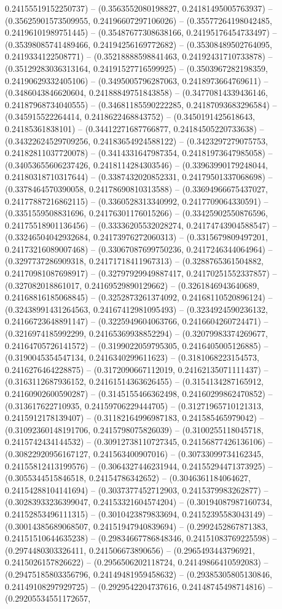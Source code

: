 0.24155519152250737) -- (0.3563552080198827, 0.24181495005763937) -- (0.35625901573509955, 0.24196607297106026) -- (0.35577264198042485, 0.24196101989751445) -- (0.35487677308638166, 0.24195176454733497) -- (0.35398085741489466, 0.24194256169772682) -- (0.35308489502764095, 0.2419334122508771) -- (0.35218888598841463, 0.24192431710733878) -- (0.35129283036313164, 0.24191527716599925) -- (0.3503967282198359, 0.24190629332405106) -- (0.3495005796287063, 0.2418973664769611) -- (0.3486043846620604, 0.24188849751843858) -- (0.34770814339436146, 0.24187968734040555) -- (0.34681185590222285, 0.24187093683296584) -- (0.345915522264414, 0.2418622468843752) -- (0.3450191425618643, 0.24185361838101) -- (0.34412271687766877, 0.24184505220733638) -- (0.34322624529709256, 0.24183654924588122) -- (0.3423297279075753, 0.24182811037720078) -- (0.3414331647987354, 0.24181973647985058) -- (0.34053655606237426, 0.2418114284303546) -- (0.33963990179248044, 0.24180318710317644) -- (0.3387432020852331, 0.24179501337068698) -- (0.3378464570390058, 0.24178690810313588) -- (0.33694966675437027, 0.24177887216862115) -- (0.3360528313340992, 0.2417709064330591) -- (0.3351559508831696, 0.24176301176015266) -- (0.33425902550876596, 0.24175518901136456) -- (0.33336205532028274, 0.24174743904588547) -- (0.33246504042932684, 0.24173976272060313) -- (0.3315679809497201, 0.24173216089007468) -- (0.33067087699750236, 0.2417246344064964) -- (0.3297737286909318, 0.24171718411967313) -- (0.3288765361504882, 0.24170981087698917) -- (0.32797929949887417, 0.24170251552337857) -- (0.327082018861017, 0.24169529890129662) -- (0.3261846943640689, 0.24168816185068845) -- (0.3252873261374092, 0.24168110520896124) -- (0.32438991431264563, 0.24167412981095493) -- (0.3234924590236132, 0.24166723648891147) -- (0.3225949604063766, 0.2416604260724471) -- (0.3216974185992299, 0.24165369938852294) -- (0.32079983374269677, 0.24164705726141572) -- (0.3199022059795305, 0.2416405005126885) -- (0.3190045354547134, 0.2416340299611623) -- (0.3181068223154573, 0.2416276464228875) -- (0.3172090667112019, 0.24162135071111437) -- (0.3163112687936152, 0.24161514363626455) -- (0.3154134287165912, 0.24160902600590287) -- (0.3145155466362498, 0.24160299862470852) -- (0.313617622710935, 0.24159706229444705) -- (0.31271965710121313, 0.2415912178139407) -- (0.31182164996987183, 0.241585465979042) -- (0.31092360148191706, 0.2415798075826039) -- (0.3100255118045718, 0.2415742434144532) -- (0.30912738110727345, 0.24156877426136106) -- (0.30822920956167127, 0.241563400907016) -- (0.30733099734162345, 0.24155812413199576) -- (0.3064327446231944, 0.24155294471373925) -- (0.3055344515846518, 0.24154786342652) -- (0.3046361184064627, 0.24154288104141694) -- (0.3037377452712903, 0.2415379983262877) -- (0.30283933236399047, 0.24153321604574204) -- (0.30194087987160734, 0.24152853496111315) -- (0.3010423879833694, 0.24152395583043149) -- (0.30014385689068507, 0.24151947940839694) -- (0.2992452867871383, 0.24151510644635238) -- (0.29834667786848346, 0.24151083769225598) -- (0.2974480303326411, 0.241506673890656) -- (0.2965493443796921, 0.2415026157826622) -- (0.2956506202118724, 0.24149866410592083) -- (0.29475185803356796, 0.24149481959458632) -- (0.29385305805130846, 0.24149108297929725) -- (0.2929542204737616, 0.24148745498714816) -- (0.29205534551172657, 